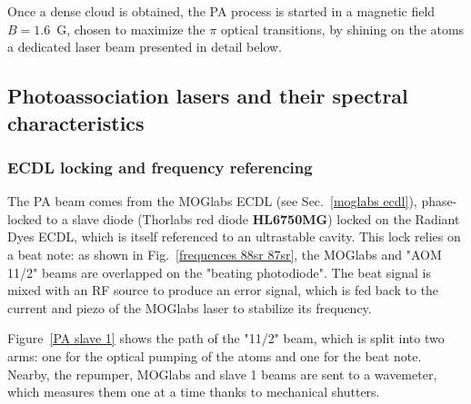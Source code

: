 Once a dense cloud is obtained, the PA process is started in a magnetic field $B = 1.6$~G, chosen to maximize the $\pi$
optical transitions, by shining on the atoms a dedicated laser beam presented in detail below.

\subsection{Photoassociation lasers and their spectral characteristics}
\subsubsection{ECDL locking and frequency referencing}
The PA beam comes from the MOGlabs ECDL (see Sec.~\ref{moglabs ecdl}), phase-locked to a slave diode (Thorlabs red diode \textbf{HL6750MG}) locked on the Radiant Dyes ECDL, which is itself referenced to an ultrastable cavity.
This lock relies on a beat note: as shown in Fig.~\ref{frequences 88sr 87sr}, the MOGlabs and "AOM 11/2" beams are overlapped on the "beating photodiode". The
beat signal is mixed with an RF source to produce an error signal, which is fed back to the current and piezo of the MOGlabs laser to stabilize its frequency.

Figure~\ref{PA slave 1} shows the path of the "11/2" beam, which is split into two arms: one for the optical pumping of the atoms and one for the beat note. Nearby, the
repumper, MOGlabs and slave 1 beams are sent to a wavemeter, which measures them one at a time thanks to mechanical shutters.

